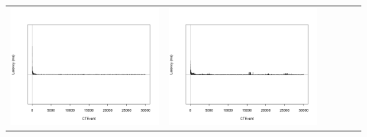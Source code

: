 \begin{table}[htbp]
{\begin{tabular}{l | ccccc}
\begin{minipage}{.15\textwidth}
				\vspace{2pt}
     			 	\includegraphics[width=\linewidth]{images/lat-log-graph/I8}
    				 \end{minipage}
    			   &	 \begin{minipage}{.15\textwidth}
     			 	
				\vspace{2pt}
     			 	\includegraphics[width=\linewidth]{images/lat-log-graph/I11}
    				 \end{minipage}
    			   &	 \begin{minipage}{.15\textwidth}
     			 	

\end{minipage}
\end{tabular}}
\end{table}
